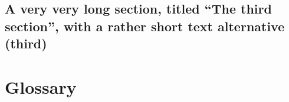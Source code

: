 \documentclass[12pt,mscthesis]{usiinfthesis}
\begin{document}
\section[third]{A very very long section, titled ``The third section'', with
  a rather  short text alternative (third)}



\nocite{*}

\appendix %



\backmatter

\chapter{Glossary} %

%
%



\end{document}

